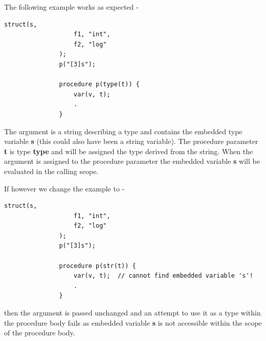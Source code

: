             The following example works as expected -
            \begin{lstlisting}[gobble=12, language=threepl]
               struct(s,
                   f1, "int",
                   f2, "log"
               );
               p("[3]s");

               procedure p(type(t)) {
                   var(v, t);
                   .
               }
            \end{lstlisting}
            The argument is a string describing a type and contains the embedded
            type variable {\bf s} (this could also have been a string variable).
            The procedure parameter {\bf t} is type {\bf type} and will be
            assigned the type derived from the string. When the argument is
            assigned to the procedure parameter the embedded
            variable {\bf s} will be evaluated in the calling scope.
            
            If however we change the example to -
            \begin{lstlisting}[gobble=12, language=threepl]
               struct(s,
                   f1, "int",
                   f2, "log"
               );
               p("[3]s");

               procedure p(str(t)) {
                   var(v, t);  // cannot find embedded variable 's'!
                   .
               }
            \end{lstlisting}
            then the argument is passed unchanged and an attempt to use it as
            a type within the procedure body fails as embedded variable {\bf s}
            is not accessible within the scope of the procedure body.
            
